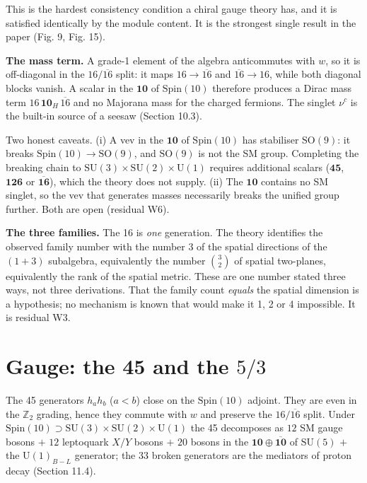 \documentclass[aps,prd,amsmath,amssymb,superscriptaddress,longbibliography,floatfix,preprint]{revtex4-2}
\begin{document}
This is the hardest consistency condition a chiral gauge theory has, and it is satisfied identically by the module content. It is the strongest single result in the paper (Fig. 9, Fig. 15).

\textbf{The mass term.} A grade-1 element of the algebra anticommutes with $w$, so it is off-diagonal in the $16/\overline{16}$ split: it maps $16 \to \overline{16}$ and $\overline{16}\to 16$, while both diagonal blocks vanish. A scalar in the $\mathbf{10}$ of $\mathrm{Spin}(10)$ therefore produces a Dirac mass term $16\,\allowbreak{}\mathbf{10}_H\,\allowbreak{}\overline{16}$ and no Majorana mass for the charged fermions. The singlet $\nu^c$ is the built-in source of a seesaw (Section 10.3).

Two honest caveats. (i) A vev in the $\mathbf{10}$ of $\mathrm{Spin}(10)$ has stabiliser $\mathrm{SO}(9)$: it breaks $\mathrm{Spin}(10)\to\mathrm{SO}(9)$, and $\mathrm{SO}(9)$ is not the SM group. Completing the breaking chain to $\mathrm{SU}(3)\times\mathrm{SU}(2)\times\mathrm{U}(1)$ requires additional scalars ($\mathbf{45}$, $\mathbf{126}$ or $\overline{\mathbf{16}}$), which the theory does not supply. (ii) The $\mathbf{10}$ contains no SM singlet, so the vev that generates masses necessarily breaks the unified group further. Both are open (residual W6).

\textbf{The three families.} The 16 is \emph{one} generation. The theory identifies the observed family number with the number 3 of the spatial directions of the $(1{+}3)$ subalgebra, equivalently the number $\binom{3}{2}$ of spatial two-planes, equivalently the rank of the spatial metric. These are one number stated three ways, not three derivations. That the family count \emph{equals} the spatial dimension is a hypothesis; no mechanism is known that would make it 1, 2 or 4 impossible. It is residual W3.

\section{Gauge: the 45 and the $5/3$}

The 45 generators $h_a h_b$ ($a<b$) close on the $\mathrm{Spin}(10)$ adjoint. They are even in the $\mathbb{Z}_2$ grading, hence they commute with $w$ and preserve the $16/\overline{16}$ split. Under $\mathrm{Spin}(10)\supset\mathrm{SU}(3)\times\mathrm{SU}(2)\times\mathrm{U}(1)$ the 45 decomposes as $12$ SM gauge bosons $+$ $12$ leptoquark $X/Y$ bosons $+$ $20$ bosons in the $\mathbf{10}\oplus\overline{\mathbf{10}}$ of $\mathrm{SU}(5)$ $+$ the $\mathrm{U}(1)_{B-L}$ generator; the 33 broken generators are the mediators of proton decay (Section 11.4).
\end{document}
